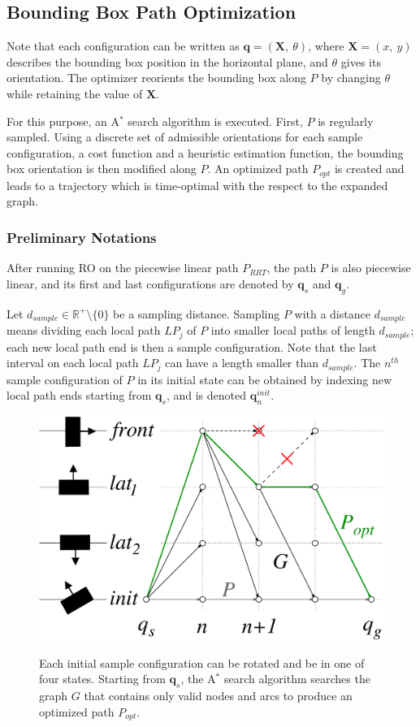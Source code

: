 \subsection{Bounding Box Path Optimization}
Note that each configuration \config{} can be written as $\mathbf{q} =
(\mathbf{X},~\theta)$, where $\mathbf{X} = (x,~y)$ describes the
bounding box position in the horizontal plane, and $\theta$ gives its
orientation.  The optimizer reorients the bounding box along $P$ by
changing $\theta$ while retaining the value of $\mathbf{X}$.

For this purpose, an A$^{*}$ search algorithm is executed. First, $P$
is regularly sampled. Using a discrete set of admissible orientations
for each sample configuration, a cost function and a heuristic
estimation function, the bounding box orientation is then modified
along $P$. An optimized path $P_{opt}$ is created and leads to a
trajectory which is time-optimal with the respect to the expanded
graph.

\subsubsection{Preliminary Notations}
After running RO on the piecewise linear path $P_{RRT}$, the
path $P$ is also piecewise linear, and its first and last
configurations are denoted by $\mathbf{q}_s$ and $\mathbf{q}_g$.

Let $d_{sample} \in \mathbb{R}^+\setminus\{0\}$ be a sampling
distance. Sampling $P$ with a distance $d_{sample}$ means dividing
each local path $LP_j$ of $P$ into smaller local paths of length
$d_{sample}$; each new local path end is then a sample
configuration. Note that the last interval on each local path $LP_j$
can have a length smaller than $d_{sample}$. The $n^{th}$ sample
configuration of $P$ in its initial state can be obtained by indexing
new local path ends starting from $\mathbf{q}_s$, and is denoted
$\mathbf{q}_n^{init}$.

\begin{figure}
  \centering
      {\includegraphics[width = 0.75\linewidth]
        {src/chap1-path-optimization/A-star.pdf}}
      \caption[The A$^{*}$ search algorithm produces an optimized path
        $P_{opt}$.]{Each initial sample configuration can be rotated
        and be in one of four states. Starting from $\mathbf{q}_s$,
        the A$^{*}$ search algorithm searches the graph $G$ that
        contains only valid nodes and arcs to produce an optimized
        path $P_{opt}$.}
      \label{fig:chap1-A-star}
\end{figure}

